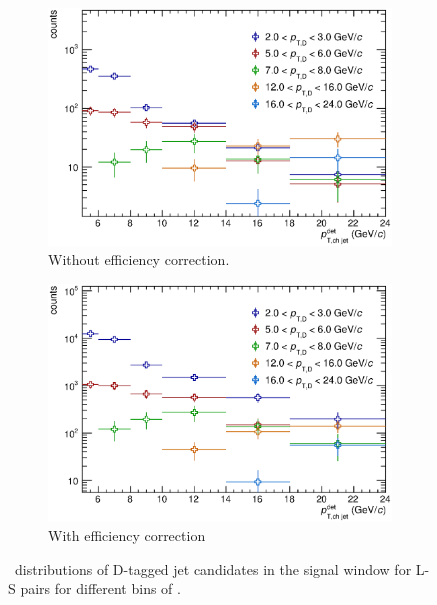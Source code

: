 \begin{figure}[tbh]
\centering
\begin{subfigure}{0.49\textwidth}
  \centering
  \includegraphics[width=1.0\linewidth]{img/HQ16_Simulation_LSSpectra}
  \caption{Without efficiency correction.}
\end{subfigure}
\begin{subfigure}{0.49\textwidth}
  \centering
  \includegraphics[width=1.0\linewidth]{img/HQ16_Simulation_LSSpectra_Eff}
  \caption{With efficiency correction}
\end{subfigure}
\caption{\ptchjetdet\ distributions of D-tagged jet candidates in the signal window for L-S pairs for different bins of \ptd.}
\label{fig:LSSpectra}
\end{figure}
